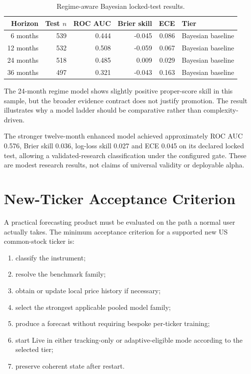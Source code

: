\documentclass[11pt]{article}
\begin{document}
\begin{table}[ht]
\centering
\caption{Regime-aware Bayesian locked-test results.}
\begin{tabular}{rrrrrl}
\toprule
Horizon & Test $n$ & ROC AUC & Brier skill & ECE & Tier\\
\midrule
6 months  & 539 & 0.444 & -0.045 & 0.086 & Bayesian baseline\\
12 months & 532 & 0.508 & -0.059 & 0.067 & Bayesian baseline\\
24 months & 518 & 0.485 &  0.009 & 0.029 & Bayesian baseline\\
36 months & 497 & 0.321 & -0.043 & 0.163 & Bayesian baseline\\
\bottomrule
\end{tabular}
\end{table}

The 24-month regime model shows slightly positive proper-score skill in this sample, but the broader evidence contract does not justify promotion. The result illustrates why a model ladder should be comparative rather than complexity-driven.

The stronger twelve-month enhanced model achieved approximately ROC AUC 0.576, Brier skill 0.036, log-loss skill 0.027 and ECE 0.045 on its declared locked test, allowing a validated-research classification under the configured gate. These are modest research results, not claims of universal validity or deployable alpha.

\section{New-Ticker Acceptance Criterion}
A practical forecasting product must be evaluated on the path a normal user actually takes. The minimum acceptance criterion for a supported new US common-stock ticker is:
\begin{enumerate}[itemsep=0.2em]
\item classify the instrument;
\item resolve the benchmark family;
\item obtain or update local price history if necessary;
\item select the strongest applicable pooled model family;
\item produce a forecast without requiring bespoke per-ticker training;
\item start Live in either tracking-only or adaptive-eligible mode according to the selected tier;
\item preserve coherent state after restart.
\end{enumerate}
\end{document}
